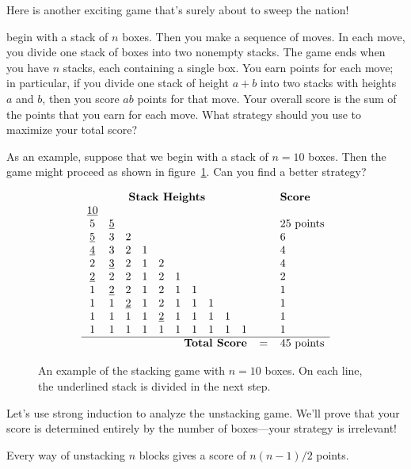 Here is another exciting game that's surely about to sweep the
nation!

 begin with a stack of $n$ boxes.  Then you
make a sequence of moves.  In each move, you divide one stack of boxes
into two nonempty stacks.  The game ends when you have $n$ stacks, each
containing a single box.  You earn points for each move; in particular, if
you divide one stack of height $a + b$ into two stacks with heights $a$
and $b$, then you score $ab$ points for that move.  Your overall score is
the sum of the points that you earn for each move.  What strategy should
you use to maximize your total score?

As an example, suppose that we begin with a stack of $n = 10$ boxes.
Then the game might proceed as shown in figure~\ref{fig:stacking-10}.
Can you find a better strategy?
\begin{figure}%
\[
\begin{array}{cccccccccccl}
\multicolumn{10}{c}{\textbf{Stack Heights}} & \quad & \textbf{Score} \\
\underline{10}&&&&&&&&& && \\
5&\underline{5}&&&&&&&& && 25 \text{ points} \\
\underline{5}&3&2&&&&&&& && 6 \\
\underline{4}&3&2&1&&&&&& && 4 \\
2&\underline{3}&2&1&2&&&&& && 4 \\
\underline{2}&2&2&1&2&1&&&& && 2 \\
1&\underline{2}&2&1&2&1&1&&& && 1 \\
1&1&\underline{2}&1&2&1&1&1&& && 1 \\
1&1&1&1&\underline{2}&1&1&1&1& && 1 \\
1&1&1&1&1&1&1&1&1&1 && 1 \\ \hline
\multicolumn{10}{r}{\textbf{Total Score}} & = & 45 \text{ points}
\end{array}
\]
\caption{An example of the stacking game with $n = 10$ boxes.  On each
line, the underlined stack is divided in the next step.}
\label{fig:stacking-10}
\end{figure}

Let's use strong induction to analyze the unstacking game.  We'll prove
that your score is determined entirely by the number of boxes---your
strategy is irrelevant!

\begin{theorem}\label{stacking}
Every way of unstacking $n$ blocks gives a score of $n(n-1)/2$ points.
\end{theorem}

